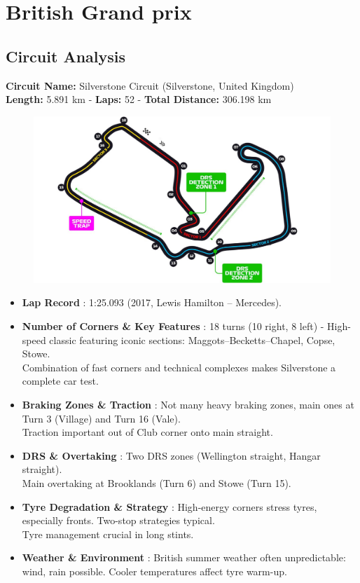 \section{British Grand prix}

\subsection{Circuit Analysis}

\textbf{Circuit Name:} Silverstone Circuit (Silverstone, United Kingdom) \\
\textbf{Length:} 5.891 km - \textbf{Laps:} 52 - \textbf{Total Distance:} 306.198 km

\begin{figure}[H]
    \centering
    \includegraphics[width=0.75\linewidth]{images/12.Great_Britain_Circuit.jpg}
\end{figure}


\begin{itemize}
    \item \textbf{Lap Record} : 1:25.093 (2017, Lewis Hamilton – Mercedes).
    
    \item \textbf{Number of Corners \& Key Features} : 18 turns (10 right, 8 left) - High-speed classic featuring iconic sections: Maggots–Becketts–Chapel, Copse, Stowe. \\
    Combination of fast corners and technical complexes makes Silverstone a complete car test.
    
    \item \textbf{Braking Zones \& Traction} : Not many heavy braking zones, main ones at Turn 3 (Village) and Turn 16 (Vale).\\
    Traction important out of Club corner onto main straight.

    \item \textbf{DRS \& Overtaking} : Two DRS zones (Wellington straight, Hangar straight).\\
    Main overtaking at Brooklands (Turn 6) and Stowe (Turn 15).
    
    \item \textbf{Tyre Degradation \& Strategy} : High-energy corners stress tyres, especially fronts. Two-stop strategies typical.\\
    Tyre management crucial in long stints.
    
    \item \textbf{Weather \& Environment} : British summer weather often unpredictable: wind, rain possible. Cooler temperatures affect tyre warm-up.
\end{itemize}

